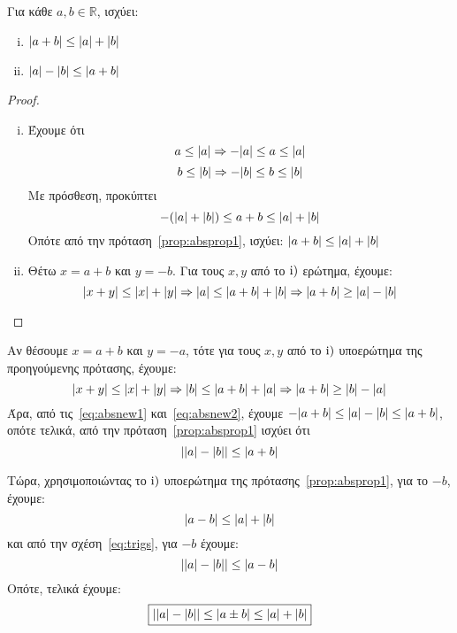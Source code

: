 \documentclass[main.tex]{subfiles}
\begin{document}
\begin{mypropbox}
  \label{prop:trigineq}
  Για κάθε $ a, b \in \mathbb{R} $, ισχύει:
  \begin{enumerate}[(i)]
    \item $ \abs{a+b} \leq \abs{a} + \abs{b}   $
    \item $ \abs{a} - \abs{b} \leq \abs{a+b}  $
  \end{enumerate}
\end{mypropbox}
\begin{proof}
\item {}
  \begin{enumerate}[(i)]
    \item Έχουμε ότι 
      \[ 
        a \leq \abs{a} \Rightarrow - \abs{a} \leq a \leq \abs{a}
      \] 
      \[
        b \leq \abs{b} \Rightarrow - \abs{b} \leq b \leq \abs{b} 
      \] 
      Με πρόσθεση, προκύπτει
      \[
        - (\abs{a} + \abs{b} ) \leq a + b \leq \abs{a} + \abs{b} 
      \] 
      Οπότε από την πρόταση~\ref{prop:absprop1}, ισχύει:
      $ \abs{a+b} \leq \abs{a} + \abs{b} $
    \item Θέτω $ x = a+b $ και $ y = -b $. Για τους $ x,y $ από το $ \rm{i}) $ 
      ερώτημα, έχουμε:
      \begin{equation}\label{eq:absnew1}
        \abs{x+y} \leq \abs{x} + \abs{y} \Rightarrow \abs{a} \leq 
        \abs{a+b} + \abs{b} \Rightarrow \abs{a+b} \geq \abs{a} - \abs{b}
      \end{equation} 
  \end{enumerate} 
\end{proof} 

\begin{rem}
  Αν θέσουμε $ x = a+b $ και $ y = -a $, τότε για τους $ x,y $ από το $ \rm{i)} $ 
  υποερώτημα της προηγούμενης πρότασης, έχουμε:
  \begin{equation}\label{eq:absnew2}
    \abs{x+y} \leq \abs{x} + \abs{y} \Rightarrow \abs{b} \leq 
    \abs{a+b} + \abs{a} \Rightarrow \abs{a+b} \geq \abs{b} - \abs{a} 
  \end{equation} 
  Άρα, από τις~\eqref{eq:absnew1} και~\eqref{eq:absnew2}, έχουμε
  $ - \abs{a+b} \leq \abs{a} - \abs{b} \leq \abs{a+b} $, οπότε τελικά, 
  από την πρόταση~\ref{prop:absprop1} ισχύει ότι
  \begin{equation}\label{eq:trigs} 
    \abs{\abs{a} - \abs{b}} \leq \abs{a+b}
  \end{equation}

  Τώρα, χρησιμοποιώντας το $ \rm{i)} $ υποερώτημα της πρότασης~\ref{prop:absprop1}, 
  για το $ -b $, έχουμε:
  \[
    \abs{a-b} \leq \abs{a} + \abs{b} 
  \] 
  και από την σχέση~\eqref{eq:trigs}, για $-b$ έχουμε:
  \[
    \abs{\abs{a} - \abs{b}} \leq \abs{a-b} 
  \]
  Οπότε, τελικά έχουμε:
  \[
    \boxed{\abs{\abs{a} - \abs{b}} \leq \abs{a \pm b} \leq \abs{a} + \abs{b}  }
  \]
\end{rem}
\end{document}
